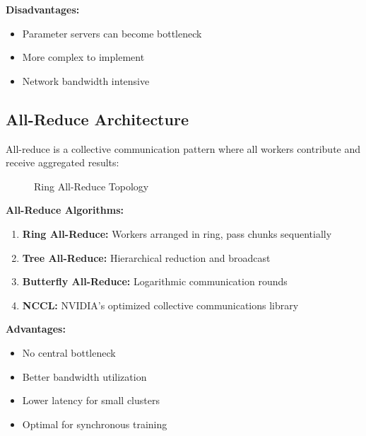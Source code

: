 \textbf{Disadvantages:}
\begin{itemize}
    \item Parameter servers can become bottleneck
    \item More complex to implement
    \item Network bandwidth intensive
\end{itemize}

\subsection{All-Reduce Architecture}

All-reduce is a collective communication pattern where all workers contribute and receive aggregated results:

\begin{figure}[h]
\centering
{}
\caption{Ring All-Reduce Topology}
\label{fig:ring_allreduce}
\end{figure}

\textbf{All-Reduce Algorithms:}

\begin{enumerate}
    \item \textbf{Ring All-Reduce:} Workers arranged in ring, pass chunks sequentially
    \item \textbf{Tree All-Reduce:} Hierarchical reduction and broadcast
    \item \textbf{Butterfly All-Reduce:} Logarithmic communication rounds
    \item \textbf{NCCL:} NVIDIA's optimized collective communications library
\end{enumerate}

\textbf{Advantages:}
\begin{itemize}
    \item No central bottleneck
    \item Better bandwidth utilization
    \item Lower latency for small clusters
    \item Optimal for synchronous training
\end{itemize}

